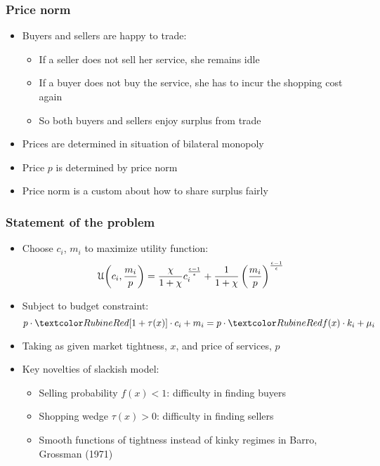\documentclass[11pt,aspectratio=169,xcolor={dvipsnames},hyperref={pdftex,pdfpagemode=UseNone,hidelinks,pdfdisplaydoctitle=true},usepdftitle=false]{beamer}
\begin{document}
\begin{frame}
\frametitle{Price norm}
\begin{itemize}
\item Buyers and sellers are happy to trade:
\begin{itemize}
	\item If a seller does not sell her service, she remains idle
	\item If a buyer does not buy the service, she has to incur the shopping cost again
	\item So both buyers and sellers enjoy surplus from trade
\end{itemize}
\item[\then] Prices are determined in situation of bilateral monopoly 
\item[\then] Price $p$ is determined by price norm
\item[\then] Price norm is a custom about how to share surplus fairly
\end{itemize}	
\end{frame}

\begin{frame}
\end{frame}

\begin{frame}
\frametitle{Statement of the problem}
\begin{itemize}
\item Choose $c_i$, $m_i$ to maximize utility function:
\begin{equation*}
\mathcal{U}{\left( c_i, \frac{m_i}{p} \right)} = \frac{\chi}{1 + \chi} c_{i}^{\frac{\epsilon - 1}{\epsilon}} + \frac{1}{1 + \chi}\left( \frac{m_i}{p} \right)^{\frac{\epsilon - 1}{\epsilon}}
\end{equation*}
\item Subject to budget constraint:
\begin{equation*}
p\cdot \al{[1+\tau(x)]} \cdot c_{i} + m_{i} = p \cdot \al{f(x)} \cdot k_{i} + \m_{i}
\end{equation*}
\item Taking as given market tightness, $x$, and price of services, $p$
\item Key novelties of slackish model:
\begin{itemize}
\item Selling probability $f(x)<1$: difficulty in finding buyers
\item Shopping wedge $\tau(x)>0$: difficulty in finding sellers
\item Smooth functions of tightness instead of kinky regimes in Barro, Grossman (1971)
\end{itemize}
\end{itemize}	
\end{frame}
\end{document}
